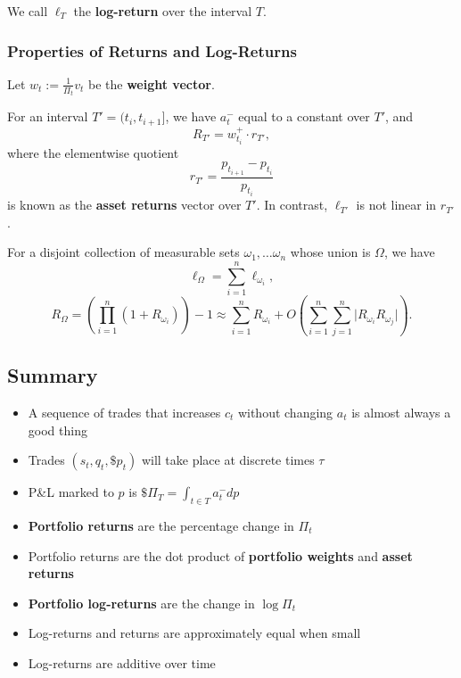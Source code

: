 \documentclass{article}
\newcommand{\sectionquote}[1]{\def\insertsquote{#1}}
\newcommand{\insertsquote}{}
\renewcommand{\insertsquote}{}%
\begin{document}
We call $\ell_T$ the \textbf{log-return} over the interval $T$.

\subsubsection{Properties of Returns and Log-Returns}
Let $w_t := \frac{1}{\Pi_t}v_t$ be the \textbf{weight vector}.%

For an interval $T' = (t_i,t_{i+1}]$, we have $a_t^-$ equal to a constant over $T'$, and
$$R_{T'} = w_{t_i}^+ \cdot r_{T'},$$
where the elementwise quotient
$$r_{T'} = \frac{p_{t_{i+1}} - p_{t_i}}{p_{t_i}}$$
is known as the \textbf{asset returns} vector over $T'$. In contrast, $\ell_{T'}$ is not linear in $r_{T'}$. %

For a disjoint collection of measurable sets $\omega_1,\ldots\omega_n$ whose union is $\Omega$, we have
$$\ell_\Omega = \sum_{i=1}^n \ell_{\omega_i},$$
$$R_\Omega = \left(\prod_{i=1}^n (1+R_{\omega_i})\right) - 1 \approx \sum_{i=1}^n R_{\omega_i} + O\left(\sum_{i=1}^n\sum_{j=1}^n \vert R_{\omega_i} R_{\omega_j} \vert\right).$$

\subsection{Summary}
\begin{itemize}
	\item A sequence of trades that increases $c_t$ without changing $a_t$ is almost always a good thing
	\item Trades $(s_t,q_t,\$p_t)$ will take place at discrete times $\tau$
	\item P\&L marked to $p$ is $\$\Pi_T = \int_{t\in T}a_t^-dp$
	\item \textbf{Portfolio returns} are the percentage change in $\Pi_t$
	\item Portfolio returns are the dot product of \textbf{portfolio weights} and \textbf{asset returns}
	\item \textbf{Portfolio log-returns} are the change in $\log\Pi_t$
	\item Log-returns and returns are approximately equal when small
	\item Log-returns are additive over time
\end{itemize}

\sectionquote{``Certainly, the modern compendium of mental illnesses (DSM-5) takes a dim view of people who think everyone is out to get them. Yet financial markets are different: people really are out to get you, after all.'' - Agustin Lebron, The Laws of Trading}
\end{document}
